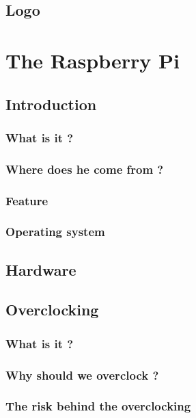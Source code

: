 \documentclass[10pt,a4paper]{article}
\begin{document}
\subsection{Logo}

\section{The Raspberry Pi}

\subsection{Introduction}

\subsubsection{What is it ?}

\subsubsection{Where does he come from ?}

\subsubsection{Feature}

\subsubsection{Operating system}

\subsection{Hardware}

\subsection{Overclocking}

\subsubsection{What is it ?}

\subsubsection{Why should we overclock ?}

\subsubsection{The risk behind the overclocking}
\end{document}
